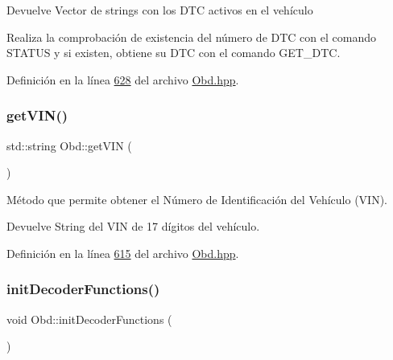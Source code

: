 \begin{DoxyReturn}{Devuelve}
Vector de strings con los D\+TC activos en el vehículo
\end{DoxyReturn}
Realiza la comprobación de existencia del número de D\+TC con el comando S\+T\+A\+T\+US y si existen, obtiene su D\+TC con el comando G\+E\+T\+\_\+\+D\+TC. 

Definición en la línea \hyperlink{Obd_8hpp_source_l00628}{628} del archivo \hyperlink{Obd_8hpp_source}{Obd.\+hpp}.

\mbox{\label{classObd_ad88a0f25a7e3961726737915668ee13d}} 
\subsubsection{\texorpdfstring{get\+V\+I\+N()}{getVIN()}}
{\footnotesize\ttfamily std\+::string Obd\+::get\+V\+IN (\begin{DoxyParamCaption}{ }\end{DoxyParamCaption})\hspace{0.3cm}{\ttfamily [inline]}}



Método que permite obtener el Número de Identificación del Vehículo (V\+IN). 

\begin{DoxyReturn}{Devuelve}
String del V\+IN de 17 dígitos del vehículo. 
\end{DoxyReturn}


Definición en la línea \hyperlink{Obd_8hpp_source_l00615}{615} del archivo \hyperlink{Obd_8hpp_source}{Obd.\+hpp}.

\mbox{\label{classObd_a560631b2e3af0a72c063f915a11e0466}} 
\subsubsection{\texorpdfstring{init\+Decoder\+Functions()}{initDecoderFunctions()}}
{\footnotesize\ttfamily void Obd\+::init\+Decoder\+Functions (\begin{DoxyParamCaption}{ }\end{DoxyParamCaption})\hspace{0.3cm}{\ttfamily [inline]}}



